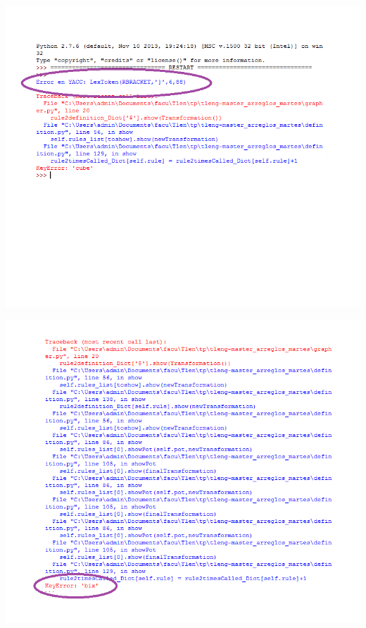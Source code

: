 \centerline{\includegraphics[scale=0.40]{../imagenes/eg22invalid.png}}



\centerline{\includegraphics[scale=0.40]{../imagenes/eg22invalid2.png}}
